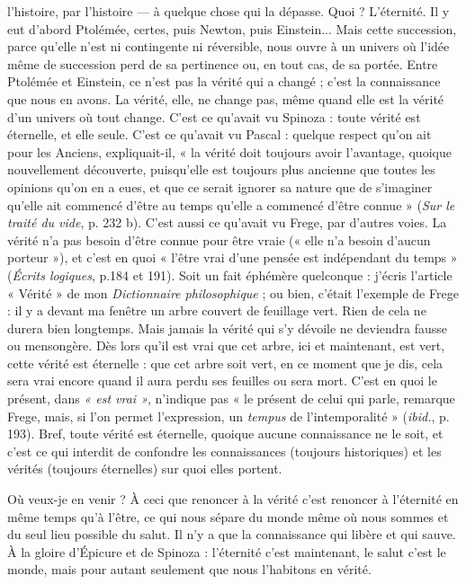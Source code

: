 l’histoire, par l’histoire — à quelque chose qui la dépasse. Quoi ? L’éternité. Il y
eut d’abord Ptolémée, certes, puis Newton, puis Einstein... Mais cette succession,
parce qu’elle n’est ni contingente ni réversible, nous ouvre à un univers où
l’idée même de succession perd de sa pertinence ou, en tout cas, de sa portée.
Entre Ptolémée et Einstein, ce n’est pas la vérité qui a changé ; c’est la connaissance
que nous en avons. La vérité, elle, ne change pas, même quand elle est la
vérité d’un univers où tout change. C’est ce qu'avait vu Spinoza : toute vérité
est éternelle, et elle seule. C’est ce qu'avait vu Pascal : quelque respect qu’on ait
pour les Anciens, expliquait-il, « la vérité doit toujours avoir l’avantage,
quoique nouvellement découverte, puisqu’elle est toujours plus ancienne que
toutes les opinions qu’on en a eues, et que ce serait ignorer sa nature que de
s’imaginer qu’elle ait commencé d’être au temps qu’elle a commencé d’être
connue » ({\it Sur le traité du vide}, p. 232 b). C’est aussi ce qu'avait vu Frege, par
d’autres voies. La vérité n’a pas besoin d’être connue pour être vraie (« elle n’a
besoin d’aucun porteur »), et c’est en quoi « l’être vrai d’une pensée est indépendant
du temps » ({\it Écrits logiques}, p.184 et 191). Soit un fait éphémère
quelconque : j'écris l’article « Vérité » de mon {\it Dictionnaire philosophique} ; ou
bien, c'était l'exemple de Frege : il y a devant ma fenêtre un arbre couvert de
feuillage vert. Rien de cela ne durera bien longtemps. Mais jamais la vérité qui
s’y dévoile ne deviendra fausse ou mensongère. Dès lors qu’il est vrai que cet
arbre, ici et maintenant, est vert, cette vérité est éternelle : que cet arbre soit
vert, en ce moment que je dis, cela sera vrai encore quand il aura perdu ses
feuilles ou sera mort. C’est en quoi le présent, dans {\it « est vrai »}, n’indique pas
« le présent de celui qui parle, remarque Frege, mais, si l’on permet l’expression,
un {\it tempus} de l’intemporalité » ({\it ibid.}, p. 193). Bref, toute vérité est éternelle,
quoique aucune connaissance ne le soit, et c’est ce qui interdit de
confondre les connaissances (toujours historiques) et les vérités (toujours éternelles)
sur quoi elles portent.

Où veux-je en venir ? À ceci que renoncer à la vérité c’est renoncer à
l'éternité en même temps qu’à l’être, ce qui nous sépare du monde même où
nous sommes et du seul lieu possible du salut. Il n’y a que la connaissance qui
libère et qui sauve. À la gloire d’Épicure et de Spinoza : l'éternité c’est maintenant,
le salut c’est le monde, mais pour autant seulement que nous l’habitons
en vérité.

